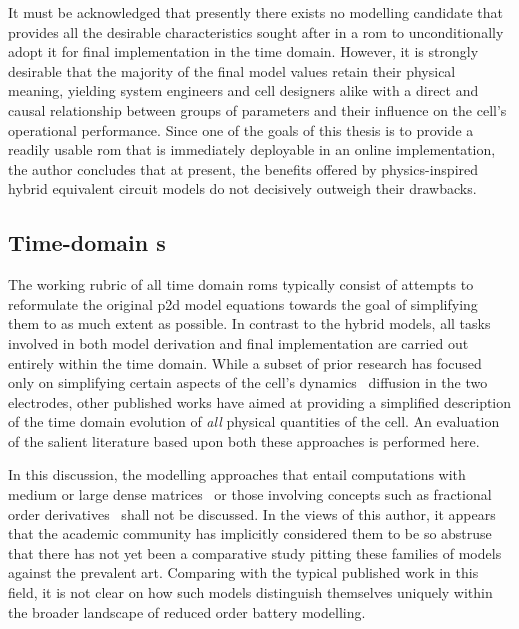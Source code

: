 It must be acknowledged that presently  there exists no modelling candidate that
provides  all the  desirable  characteristics  sought after  in  a \gls{rom}  to
unconditionally adopt it  for final implementation in the  time domain. However,
it is  strongly desirable  that the  majority of the  final model  values retain
their physical meaning, yielding system  engineers and cell designers alike with
a  direct  and  causal  relationship  between groups  of  parameters  and  their
influence on the cell's operational performance.  Since one of the goals of this
thesis is to  provide a readily usable \gls{rom} that  is immediately deployable
in an online implementation, the author  concludes that at present, the benefits
offered by physics-inspired  hybrid equivalent circuit models  do not decisively
outweigh their drawbacks.



\subsection{Time-domain  s}

The working rubric of all time  domain \glspl{rom} typically consist of attempts
to  reformulate the  original  \gls{p2d}  model equations  towards  the goal  of
simplifying  them to  as much  extent  as possible.  In contrast  to the  hybrid
models, all tasks involved in both model derivation and final implementation are
carried out  entirely within the time  domain. While a subset  of prior research
has  focused  only  on  simplifying  certain aspects  of  the  cell's  dynamics
\eg~diffusion  in  the two  electrodes,  other  published  works have  aimed  at
providing a  simplified description of  the time domain evolution  of \emph{all}
physical quantities of  the cell. An evaluation of the  salient literature based
upon both these approaches is performed here.


In  this discussion,  the  modelling approaches  that  entail computations  with
medium or large dense matrices~\cite{Li2016,Xu2016,Corno2015} or those involving
concepts such  as fractional  order derivatives~\cite{Sabatier2014,Sabatier2015,
Li2017, Mu2017, Wang2017}  shall not be discussed. In the  views of this author,
it appears that  the academic community has implicitly considered  them to be so
abstruse that there has not yet  been a comparative study pitting these families
of models against  the prevalent art. Comparing with the  typical published work
in  this field,  it  is not  clear  on how  such  models distinguish  themselves
uniquely within the broader landscape of reduced order battery modelling.


